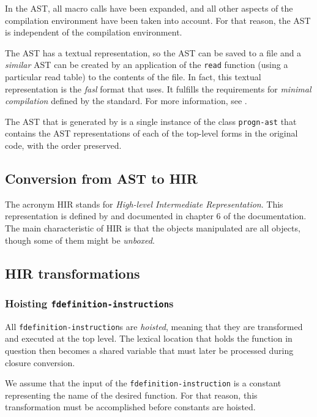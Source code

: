 In the AST, all macro calls have been expanded, and all other aspects
of the compilation environment have been taken into account.  For that
reason, the AST is independent of the compilation environment.

The AST has a textual representation, so the AST can be saved to a
file and a \emph{similar} AST can be created by an application of the
\texttt{read} function (using a particular read table) to the contents
of the file.  In fact, this textual representation is the \emph{fasl}
format that \sysname{} uses.  It fulfills the requirements for
\emph{minimal compilation} defined by the \commonlisp{} standard.
For more information, see .

The AST that is generated by \cleavir{} is a single instance of the
class \texttt{progn-ast} that contains the AST representations of each
of the top-level forms in the original code, with the order preserved.

\subsection{Conversion from AST to HIR}

The acronym HIR stands for \emph{High-level Intermediate
  Representation}.  This representation is defined by \cleavir{} and
documented in chapter 6 of the \cleavir{} documentation.
The main characteristic of HIR is that the objects manipulated are all
\commonlisp{} objects, though some of them might be \emph{unboxed}.

\subsection{HIR transformations}

\subsubsection{Hoisting \texttt{fdefinition-instruction}s}

All \texttt{fdefinition-instruction}s are \emph{hoisted}, meaning that
they are transformed and executed at the top level.  The lexical
location that holds the function in question then becomes a shared
variable that must later be processed during closure conversion.

We assume that the input of the \texttt{fdefinition-instruction} is a
constant representing the name of the desired function.  For that
reason, this transformation must be accomplished before constants are
hoisted.

